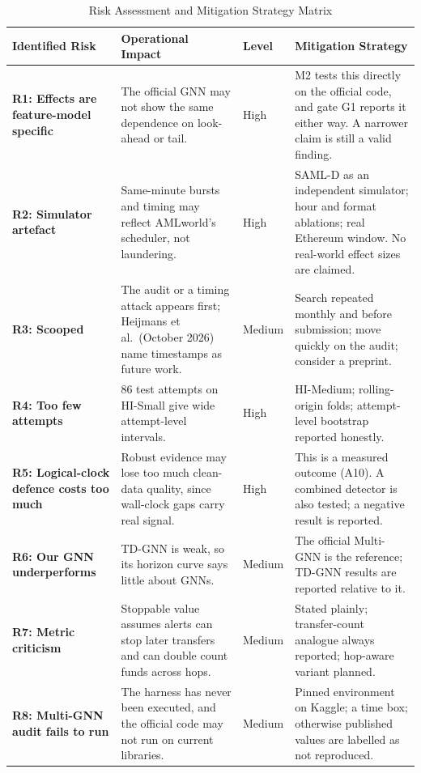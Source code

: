 \documentclass[11pt,a4paper]{article}
\begin{document}
\begin{table}[htbp]
\centering
\small
\caption{Risk Assessment and Mitigation Strategy Matrix}
\label{tab:risk_management}
\begin{tabularx}{\textwidth}{L{2.7cm} L{3.4cm} L{1.2cm} X}
\toprule
\textbf{Identified Risk} & \textbf{Operational Impact} & \textbf{Level} & \textbf{Mitigation Strategy} \\
\midrule
\textbf{R1: Effects are feature-model specific} & The official GNN may not show the same dependence on look-ahead or tail. & High & M2 tests this directly on the official code, and gate G1 reports it either way. A narrower claim is still a valid finding. \\
\midrule
\textbf{R2: Simulator artefact} & Same-minute bursts and timing may reflect AMLworld's scheduler, not laundering. & High & SAML-D as an independent simulator; hour and format ablations; real Ethereum window. No real-world effect sizes are claimed. \\
\midrule
\textbf{R3: Scooped} & The audit or a timing attack appears first; Heijmans et al.\ (October 2026) name timestamps as future work. & Medium & Search repeated monthly and before submission; move quickly on the audit; consider a preprint. \\
\midrule
\textbf{R4: Too few attempts} & 86 test attempts on HI-Small give wide attempt-level intervals. & High & HI-Medium; rolling-origin folds; attempt-level bootstrap reported honestly. \\
\midrule
\textbf{R5: Logical-clock defence costs too much} & Robust evidence may lose too much clean-data quality, since wall-clock gaps carry real signal. & High & This is a measured outcome (A10). A combined detector is also tested; a negative result is reported. \\
\midrule
\textbf{R6: Our GNN underperforms} & TD-GNN is weak, so its horizon curve says little about GNNs. & Medium & The official Multi-GNN is the reference; TD-GNN results are reported relative to it. \\
\midrule
\textbf{R7: Metric criticism} & Stoppable value assumes alerts can stop later transfers and can double count funds across hops. & Medium & Stated plainly; transfer-count analogue always reported; hop-aware variant planned. \\
\midrule
\textbf{R8: Multi-GNN audit fails to run} & The harness has never been executed, and the official code may not run on current libraries. & Medium & Pinned environment on Kaggle; a time box; otherwise published values are labelled as not reproduced. \\

\end{tabularx}
\end{table}
\end{document}
